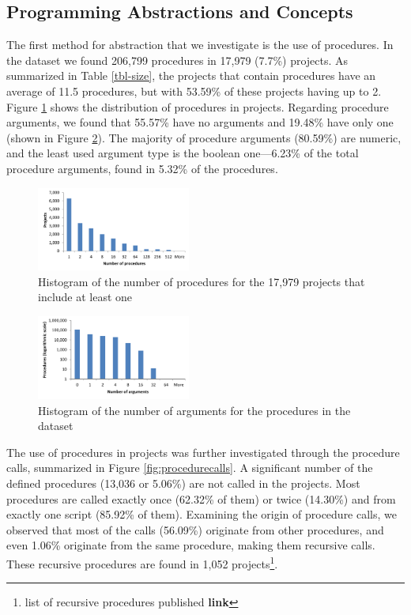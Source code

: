\documentclass{sig-alternate}
\newcommand{\todo}[1]{\textbf{#1}}
\begin{document}
\subsection{Programming Abstractions and Concepts}

The first method for abstraction that we investigate is the use of procedures. In the dataset we found 206,799 procedures in 17,979 (7.7\%) projects. As summarized in Table \ref{tbl-size}, the projects that contain procedures have an average of 11.5 procedures, but with 53.59\% of these projects having up to 2. Figure \ref{fig:proceduresperproject} shows the distribution of procedures in projects. Regarding procedure arguments, we found that 55.57\% have no arguments and 19.48\% have only one (shown in Figure \ref{fig:procedurearguments}). The majority of procedure arguments (80.59\%) are numeric, and the least used argument type is the boolean one---6.23\% of the total procedure arguments, found in 5.32\% of the procedures.

\begin{figure}
	\centering
	\includegraphics[width=0.45\textwidth]{fig/charts/6proceduresperproject}
	\caption{Histogram of the number of procedures for the 17,979 projects that include at least one}
	\label{fig:proceduresperproject}
\end{figure}

\begin{figure}
	\centering
	\includegraphics[width=0.45\textwidth]{fig/charts/5arguments}
	\caption{Histogram of the number of arguments for the procedures in the dataset}
	\label{fig:procedurearguments}
\end{figure}

The use of procedures in projects was further investigated through the procedure calls, summarized in Figure \ref{fig:procedurecalls}. A significant number of the defined procedures (13,036 or 5.06\%) are not called in the projects. Most procedures are called exactly once (62.32\% of them) or twice (14.30\%) and from exactly one script (85.92\% of them). Examining the origin of procedure calls, we observed that most of the calls (56.09\%) originate from other procedures, and even 1.06\% originate from the same procedure, making them recursive calls. These recursive procedures are found in 1,052 projects\footnote{list of recursive procedures published \todo{link}}.
\end{document}
